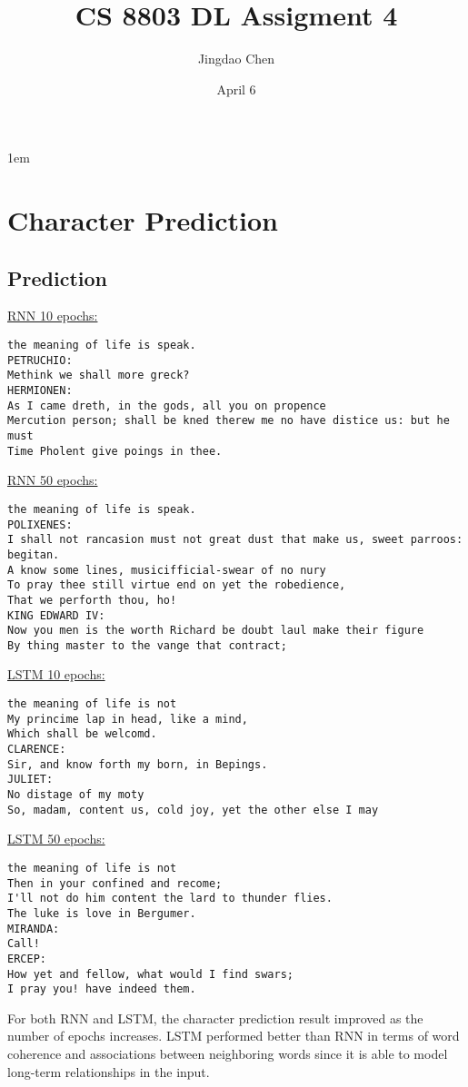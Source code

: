 \documentclass[twoside,12pt]{article}
\begin{document}
\title{CS 8803 DL Assigment 4}
\author{Jingdao Chen}
\date{April 6}
\maketitle
\openup 1em

\section{Character Prediction}

\subsection{Prediction}

\underline{RNN 10 epochs:}
\begin{verbatim}
the meaning of life is speak.
PETRUCHIO:
Methink we shall more greck?
HERMIONEN:
As I came dreth, in the gods, all you on propence
Mercution person; shall be kned therew me no have distice us: but he must
Time Pholent give poings in thee.
\end{verbatim}

\underline{RNN 50 epochs:}
\begin{verbatim}
the meaning of life is speak.
POLIXENES:
I shall not rancasion must not great dust that make us, sweet parroos: begitan.
A know some lines, musicifficial-swear of no nury
To pray thee still virtue end on yet the robedience,
That we perforth thou, ho!
KING EDWARD IV:
Now you men is the worth Richard be doubt laul make their figure
By thing master to the vange that contract;
\end{verbatim}

\underline{LSTM 10 epochs:}
\begin{verbatim}
the meaning of life is not
My princime lap in head, like a mind,
Which shall be welcomd.
CLARENCE:
Sir, and know forth my born, in Bepings.
JULIET:
No distage of my moty
So, madam, content us, cold joy, yet the other else I may
\end{verbatim}

\underline{LSTM 50 epochs:}
\begin{verbatim}
the meaning of life is not
Then in your confined and recome;
I'll not do him content the lard to thunder flies.
The luke is love in Bergumer.
MIRANDA:
Call!
ERCEP:
How yet and fellow, what would I find swars;
I pray you! have indeed them.
\end{verbatim}

For both RNN and LSTM, the character prediction result improved as the number of epochs increases.
LSTM performed better than RNN in terms of word coherence and associations between neighboring
words since it is able to model long-term relationships in the input.
\end{document}
